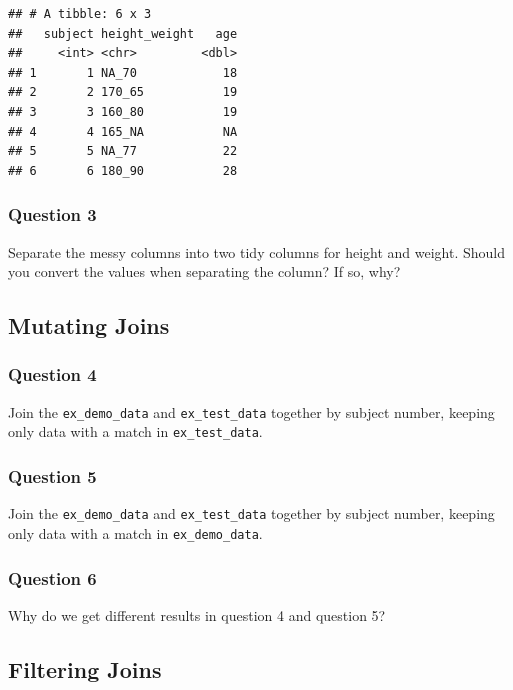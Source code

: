 \documentclass[
]{book}
\begin{document}
\begin{verbatim}
## # A tibble: 6 x 3
##   subject height_weight   age
##     <int> <chr>         <dbl>
## 1       1 NA_70            18
## 2       2 170_65           19
## 3       3 160_80           19
## 4       4 165_NA           NA
## 5       5 NA_77            22
## 6       6 180_90           28
\end{verbatim}

\hypertarget{question-3-3}{%
\subsubsection{Question 3}\label{question-3-3}}

Separate the messy columns into two tidy columns for height and weight. Should you convert the values when separating the column? If so, why?

\hypertarget{mutating-joins-1}{%
\subsection{Mutating Joins}\label{mutating-joins-1}}

\hypertarget{question-4-3}{%
\subsubsection{Question 4}\label{question-4-3}}

Join the \texttt{ex\_demo\_data} and \texttt{ex\_test\_data} together by subject number, keeping only data with a match in \texttt{ex\_test\_data}.

\hypertarget{question-5-3}{%
\subsubsection{Question 5}\label{question-5-3}}

Join the \texttt{ex\_demo\_data} and \texttt{ex\_test\_data} together by subject number, keeping only data with a match in \texttt{ex\_demo\_data}.

\hypertarget{question-6-3}{%
\subsubsection{Question 6}\label{question-6-3}}

Why do we get different results in question 4 and question 5?

\hypertarget{filtering-joins-1}{%
\subsection{Filtering Joins}\label{filtering-joins-1}}
\end{document}
